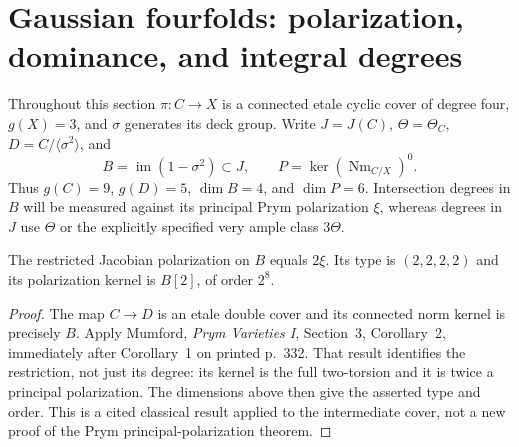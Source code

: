 \section{Gaussian fourfolds: polarization, dominance, and integral degrees}

Throughout this section $\pi:C\to X$ is a connected etale cyclic cover of
degree four, $g(X)=3$, and $\sigma$ generates its deck group. Write
$J=J(C)$, $\Theta=\Theta_C$, $D=C/\langle\sigma^2\rangle$, and
\[
 B=\operatorname{im}(1-\sigma^2)\subset J,
 \qquad P=\ker(\operatorname{Nm}_{C/X})^0.
\]
Thus $g(C)=9$, $g(D)=5$, $\dim B=4$, and $\dim P=6$.
Intersection degrees in $B$ will be measured against its principal Prym
polarization $\xi$, whereas degrees in $J$ use $\Theta$ or the explicitly
specified very ample class $3\Theta$.

\begin{proposition}
\label{HD-G01}
The restricted Jacobian polarization on $B$ equals $2\xi$. Its type is
$(2,2,2,2)$ and its polarization kernel is $B[2]$, of order $2^8$.
\end{proposition}
\begin{proof}
The map $C\to D$ is an etale double cover and its connected norm kernel
is precisely $B$. Apply Mumford, \emph{Prym Varieties I}, Section~3,
Corollary~2, immediately after Corollary~1 on printed p.~332.
That result identifies the restriction, not just its degree: its kernel
is the full two-torsion and it is twice a principal polarization.
The dimensions above then give the asserted type and order.
This is a cited classical result applied to the intermediate cover, not
a new proof of the Prym principal-polarization theorem.
\end{proof}

